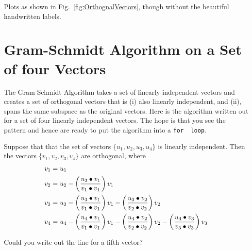 Plots as shown in Fig.~\ref{fig:OrthognalVectors}, though without the beautiful handwritten labels.








\section{Gram-Schmidt Algorithm on a Set of four Vectors}

The Gram-Schmidt Algorithm takes a set of linearly independent vectors and creates a set of orthogonal vectors that is (i) also linearly independent, and (ii), spans the same subspace as the original vectors. Here is the algorithm written out for a set of four linearly independent vectors. The hope is that you see the pattern and hence are ready to put the algorithm into a \texttt{for\, loop}.\\

\begin{tcolorbox}[sharp corners, colback=green!30, colframe=green!80!blue, title=\textbf{\Large Gram-Schmidt Process for 4 Vectors
}]
Suppose that that the set of vectors $\{ u_1, u_2, u_3, u_4\}$ is linearly independent. Then the vectors  $\{ v_1, v_2, v_3, v_4\}$ are orthogonal, where
$$
 \begin{aligned}
 v_1 & = u_1 \\
 v_2 &= u_2 - \left(\frac{u_2 \bullet v_1}{v_1 \bullet v_1}\right) v_1 \bigskip \\
 v_3 &= u_3 -\left(\frac{u_3 \bullet v_1}{v_1 \bullet v_1}\right) v_1 - \left(\frac{u_3 \bullet v_2}{v_2 \bullet v_2}\right) v_2 \\
 v_4 & = u_4  - \left(\frac{u_4 \bullet v_1}{v_1 \bullet v_1}\right) v_1 - \left(\frac{u_4 \bullet v_2}{v_2 \bullet v_2}\right) v_2 - \left(\frac{u_4 \bullet v_3}{v_3 \bullet v_3}\right) v_3
	\end{aligned}
$$


Could you write out the line for a fifth vector? 
\end{tcolorbox}

